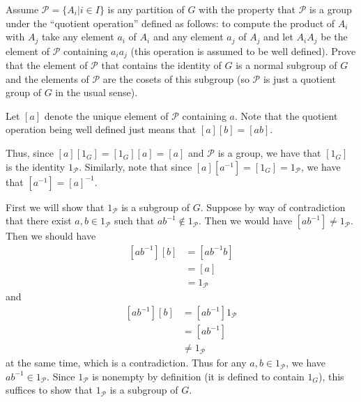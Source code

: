 \documentclass[12 pt, letterpaper]{hmcpset}
\begin{document}
\begin{problem}
	Assume $\mathcal{P} = \{ A_{i} | i \in I \}$ is any partition of $G$ with the property that $\mathcal{P}$ is a group under the ``quotient operation'' defined as follows: to compute the product of $A_{i}$ with $A_{j}$ take any element $a_{i}$ of $A_{i}$ and any element $a_{j}$ of $A_{j}$ and let $A_{i}A_{j}$ be the element of $\mathcal{P}$ containing $a_{i}a_{j}$ (this operation is assumed to be well defined). Prove that the element of $\mathcal{P}$ that contains the identity of $G$ is a normal subgroup of $G$ and the elements of $\mathcal{P}$ are the cosets of this subgroup (so $\mathcal{P}$ is just a quotient group of $G$ in the usual sense).
\end{problem}

\begin{solution}
	Let $[a]$ denote the unique element of $\mathcal{P}$ containing $a$. Note that the quotient operation being well defined just means that $[a][b] = [ab]$. 

	Thus, since $[a][1_{G}] = [1_{G}][a] = [a]$ and $\mathcal{P}$ is a group, we have that $[1_{G}]$ is the identity $1_{\mathcal{P}}$. Similarly, note that since $[a][a^{-1}] = [1_{G}] = 1_{\mathcal{P}}$, we have that $[a^{-1}] = [a]^{-1}$. 

	First we will show that $1_{\mathcal{P}}$ is a subgroup of $G$. Suppose by way of contradiction that there exist $a, b \in 1_{\mathcal{P}}$ such that $ab^{-1} \notin 1_{\mathcal{P}}$. Then we would have $[ab^{-1}] \neq 1_{\mathcal{P}}$. Then we should have
	\[
		\begin{split}
			[ab^{-1}][b] & = [ab^{-1}b] \\
				     & = [a] \\
				     & = 1_{\mathcal{P}}
		\end{split}
	\]
	and 
	\[
		\begin{split}
			[ab^{-1}][b] & = [ab^{-1}] 1_{\mathcal{P}} \\
				     & = [ab^{-1}] \\
				     & \neq 1_{\mathcal{P}}
		\end{split}
	\]
	at the same time, which is a contradiction. Thus for any $a, b \in 1_{\mathcal{P}}$, we have $ab^{-1} \in 1_{\mathcal{P}}$. Since $1_{\mathcal{P}}$ is nonempty by definition (it is defined to contain $1_{G}$), this suffices to show that $1_{\mathcal{P}}$ is a subgroup of $G$. 
	

\end{solution}
\end{document}
